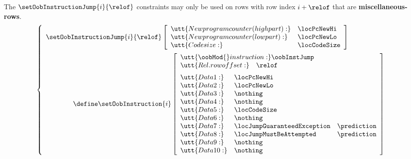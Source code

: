 \saNote{} The $\setOobInstructionJump{i}{\relof}$ constraints may only be used on rows with row index $i + \relof$ that are \textbf{miscellaneous-rows}.
\[
        \left\{ \begin{array}{l}
                \setOobInstructionJump {i}{\relof}
                \left[ \begin{array}{llr}
                        \utt{New program counter (high part):} & \locPcNewHi      \\
                        \utt{New program counter (low  part):} & \locPcNewLo      \\
                        \utt{Code size:}                       & \locCodeSize     \\
                \end{array} \right] \vspace{2mm} \\
                \qquad \qquad \define
                \setOobInstruction{i}
                \left[ \begin{array}{llr}
                        \multicolumn{3}{l}{\utt{\oobMod{} instruction:} \oobInstJump} \\
                        \multicolumn{3}{l}{\utt{Rel. row offset:}            \quad \relof}         \vspace{2mm} \\
			\utt{Data 1:}  & \locPcNewHi                 \\
                        \utt{Data 2:}  & \locPcNewLo                 \\
                        \utt{Data 3:}  & \nothing                    \\
                        \utt{Data 4:}  & \nothing                    \\
                        \utt{Data 5:}  & \locCodeSize                \\
                        \utt{Data 6:}  & \nothing                    \\
                        \utt{Data 7:}  & \locJumpGuaranteedException  & \prediction \\
                        \utt{Data 8:}  & \locJumpMustBeAttempted      & \prediction \\
                        \utt{Data 9:}  & \nothing                    \\
                        \utt{Data 10:} & \nothing                    \\
                \end{array} \right] \\
        \end{array} \right.
\]
